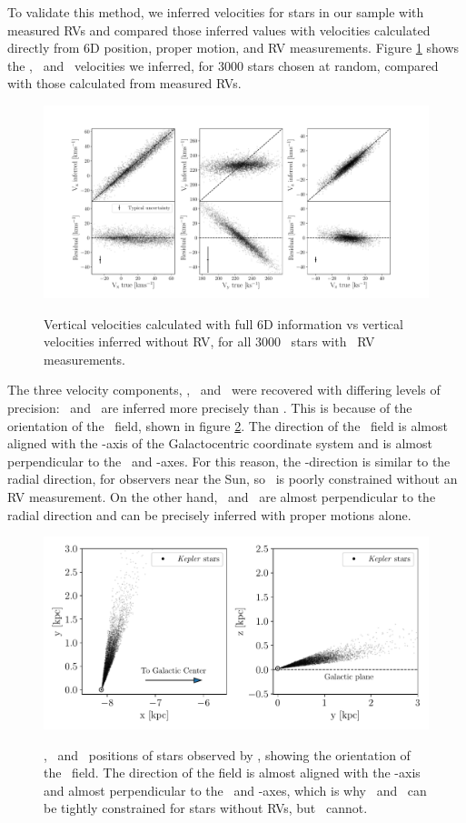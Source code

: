 To validate this method, we inferred velocities for stars in our sample with
measured RVs and compared those inferred values with velocities calculated
directly from 6D position, proper motion, and RV measurements.
Figure \ref{fig:residuals} shows the \vx, \vy\ and \vz\ velocities we
inferred, for 3000 stars chosen at random, compared with those calculated from
measured RVs.
\begin{figure}[ht!]
\caption{Vertical velocities calculated with full 6D information vs vertical
    velocities inferred without RV, for all 3000 \mct\ stars with \gaia\ RV
    measurements.}
  \centering
    \includegraphics[width=1\textwidth]{residuals}
\label{fig:residuals}
\end{figure}

The three velocity components, \vx, \vy\ and \vz\ were recovered with
differing levels of precision: \vx\ and \vz\ are inferred more precisely than
\vy.
This is because of the orientation of the \kepler\ field, shown in figure
\ref{fig:kepler_field}.
The direction of the \kepler\ field is almost aligned with the \y-axis of the
Galactocentric coordinate system and is almost perpendicular to the \x\ and
\z-axes.
For this reason, the \y-direction is similar to the radial direction, for
observers near the Sun, so \vy\ is poorly constrained without an RV
measurement.
On the other hand, \vx\ and \vz\ are almost perpendicular to the radial
direction and can be precisely inferred with proper motions alone.
\begin{figure}[ht!]
\caption{
\x, \y\ and \z\ positions of stars observed by \kepler, showing the
    orientation of the \kepler\ field.
The direction of the field is almost aligned with the \y-axis and almost
    perpendicular to the \x\ and \z-axes, which is why \vx\ and \vz\ can be
    tightly constrained for stars without RVs, but \vy\ cannot.
}
  \centering
    \includegraphics[width=.7\textwidth]{kepler_field}
\label{fig:kepler_field}
\end{figure}
